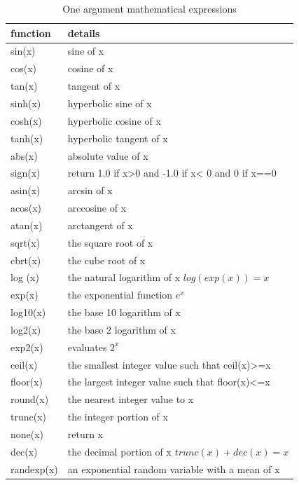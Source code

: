 \documentclass[12pt]{article} %
\begin{document}
\begin{table}[ht]
	
	\caption{One argument mathematical expressions} %
	\centering %
	\begin{tabular}{l p{11cm}} %
		\hline %
		function & details \\ [0.5ex] %
		\hline %
		sin(x)  & sine of x \\
		cos(x)  & cosine of x \\
		tan(x)  & tangent of x \\
		sinh(x)  & hyperbolic sine of x \\
		cosh(x)  & hyperbolic cosine of x \\
		tanh(x)  & hyperbolic tangent of x \\
		abs(x)  & absolute value of x \\
		sign(x) & return 1.0 if x>0 and -1.0 if x< 0 and 0 if x==0 \\
		asin(x) & arcsin of x \\
		acos(x) & arccosine of x \\
		atan(x) & arctangent of x \\
		sqrt(x) & the square root of x \\
		cbrt(x) & the cube root of x \\
		log (x) & the natural logarithm of x $log(exp(x))=x$\\
		exp(x)  & the exponential function $e^x$ \\
		log10(x) & the base 10 logarithm of x \\
		log2(x) & the base 2 logarithm of x \\
		exp2(x) & evaluates $2^x$ \\
		ceil(x) & the smallest integer value such that ceil(x)>=x \\
		floor(x) & the largest integer value such that floor(x)<=x \\
		round(x) & the nearest integer value to x \\
		trunc(x) & the integer portion of x \\
		none(x)  & return x \\
		dec(x) & the decimal portion of x $trunc(x)+dec(x)=x$\\
		randexp(x) & an exponential random variable with a mean of x \\	
		\hline %
	\end{tabular}
	\label{table:func1}
\end{table} 
\end{document}
